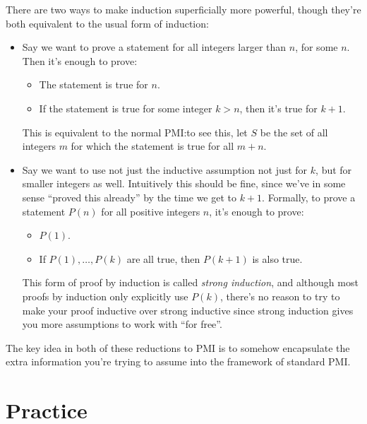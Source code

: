 \documentclass{amsart}
\begin{document}
There are two ways to make induction superficially more powerful, though they're
both equivalent to the usual form of induction:
\begin{itemize}
  \item Say we want to prove a statement for all integers larger than $n$, for
    some $n$. Then it's enough to prove:
    \begin{itemize}
      \item The statement is true for $n$.
      \item If the statement is true for some integer $k>n$, then it's true for
        $k+1$.
    \end{itemize}
    This is equivalent to the normal PMI:\@ to see this, let $S$ be the set of
    all integers $m$ for which the statement is true for all $m+n$.
  \item Say we want to use not just the inductive assumption not just for $k$,
    but for smaller integers as well. Intuitively this should be fine, since
    we've in some sense ``proved this already'' by the time we get to $k+1$.
    Formally, to prove a statement $P(n)$ for all positive integers $n$, it's
    enough to prove:
    \begin{itemize}
      \item $P(1)$.
      \item If $P(1),\ldots,P(k)$ are all true, then $P(k+1)$ is also true.
    \end{itemize}
    This form of proof by induction is called \emph{strong induction}, and
    although most proofs by induction only explicitly use $P(k)$, there's no
    reason to try to make your proof inductive over strong inductive since
    strong induction gives you more assumptions to work with ``for free''.
\end{itemize}
The key idea in both of these reductions to PMI is to somehow encapsulate the
extra information you're trying to assume into the framework of standard PMI.
\newpage
\section{Practice}
\newpage
\end{document}
